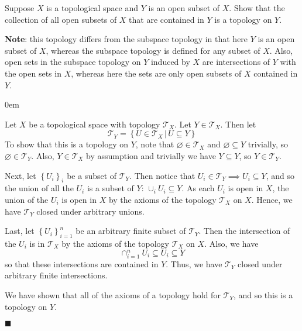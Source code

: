 \documentclass[12pt]{article}
\renewcommand{\qed}{\hfill$\blacksquare$}
\renewenvironment{proof}{\begin{addmargin}[1em]{0em}\begin{newproof}}{\end{newproof}\end{addmargin}\qed}
\newenvironment{exercise}[2][Exercise]{\begin{trivlist}
\item[\hskip \labelsep {\bfseries #1}\hskip \labelsep {\bfseries #2.}]}{\end{trivlist}}
\begin{document}
\begin{exercise}{2.5}
Suppose $X$ is a topological space and $Y$ is an open subset of $X$. Show that the collection of all open subsets of $X$ that are contained in $Y$ is a topology on $Y$.
\end{exercise}
\textbf{Note}: this topology differs from the subspace topology in that here $Y$ is an open subset of $X$, whereas the subspace topology is defined for any subset of $X$. Also, open sets in the subspace topology on $Y$ induced by $X$ are intersections of $Y$ with the open sets in $X$, whereas here the sets are only open subsets of $X$ contained in $Y$. \\
\begin{proof}
Let $X$ be a topological space with topology $\mathcal{T}_X$. Let $Y\in \mathcal{T}_X$. Then let $$ \mathcal{T}_Y = \left\{ U \in \mathcal{T}_X \, | \, U\subseteq Y \right\}$$ To show that this is a topology on $Y$, note that $\varnothing \in \mathcal{T}_X$ and $\varnothing \subseteq Y$ trivially, so $\varnothing \in \mathcal{T}_Y$. Also, $Y\in \mathcal{T}_X$ by assumption and trivially we have $Y \subseteq Y$, so $Y \in \mathcal{T}_Y$.

Next, let $\left\{U_i\right\}_i$ be a subset of $\mathcal{T}_Y$. Then notice that $U_i \in \mathcal{T}_Y \implies U_i \subseteq Y$, and so the union of all the $U_i$ is a subset of $Y$: $\cup_i U_i \subseteq Y$. As each $U_i$ is open in $X$, the union of the $U_i$ is open in $X$ by the axioms of the topology $\mathcal{T}_X$ on $X$. Hence, we have $\mathcal{T}_Y$ closed under arbitrary unions.

Last, let $\left\{U_i\right\}_{i=1}^n$ be an arbitrary finite subset of $\mathcal{T}_Y$. Then the intersection of the $U_i$ is in $\mathcal{T}_X$ by the axioms of the topology $\mathcal{T}_X$ on $X$. Also, we have $$ \cap_{i=1}^n U_i \subseteq U_i \subseteq Y $$ so that these intersections are contained in $Y$. Thus, we have $\mathcal{T}_Y$ closed under arbitrary finite intersections.

We have shown that all of the axioms of a topology hold for $\mathcal{T}_Y$, and so this is a topology on $Y$.
\end{proof}
\end{document}
